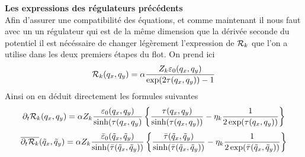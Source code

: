 \documentclass[10pt]{article}
\begin{document}
\vspace*{11pt}
\noindent
\textbf{Les expressions des régulateurs précédents} \\

Afin d'assurer une compatibilité des équations, et comme maintenant il nous faut avec un un régulateur qui est de la même dimension que la dérivée seconde du potentiel il est nécéssaire de changer légèrement l'expression de $\mathcal{R}_k$ que l'on a utilise dans les deux premiers étapes du flot. On prend ici
\begin{equation}
\mathcal{R}_k(q_x, q_y) = \alpha \frac{Z_k \varepsilon_0(q_x, q_y)}{\exp(2\tau(q_x, q_y)) -1}
\end{equation}
Ainsi on en déduit directement les formules suivantes
\begin{equation}
\partial_t \mathcal{R}_k(q_x, q_y) = \alpha Z_k \frac{\varepsilon_0(q_x, q_y)}{\sinh(\tau(q_x, q_y)}   \left\{ \frac{\tau(q_x, q_y)}{\sinh(\tau(q_x, q_y))} - \eta_k \frac{1}{2\exp(\tau(q_x, q_y))} \right\}
\end{equation}
\begin{equation}
\overline{\partial_t \mathcal{R}_k}(\tilde{q}_x, \tilde{q}_y) = \alpha Z_k \frac{\bar{\varepsilon}_0(\tilde{q}_x, \tilde{q}_y)}{\sinh(\bar{\tau}(\tilde{q}_x, \tilde{q}_y))}   \left\{ \frac{\bar{\tau}(\tilde{q}_x, \tilde{q}_y)}{\sinh(\bar{\tau}(\tilde{q}_x, \tilde{q}_y))} - \eta_k \frac{1}{2\exp(\bar{\tau}(\tilde{q}_x, \tilde{q}_y))} \right\}
\end{equation}
\end{document}
